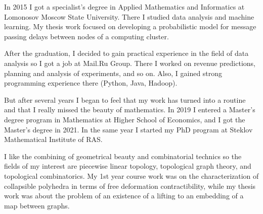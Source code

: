 \documentclass{resume}
\begin{document}
\vspace{1em}

In 2015 I got a specialist's degree in Applied Mathematics and Informatics at Lomonosov Moscow State
University. There I studied data analysis and machine learning. My thesis work focused on developing
a probabilistic model for message passing delays between nodes of a computing cluster.

After the graduation, I decided to gain practical experience in the field of data analysis so I got a
job at Mail.Ru Group. There I worked on revenue predictions, planning and analysis of experiments,
and so on. Also, I gained strong programming experience there (Python, Java, Hadoop).

But after several years I began to feel that my work has turned into a routine and that I really
missed the beauty of mathematics. In 2019 I entered a Master's degree program in Mathematics at
Higher School of Economics, and I got the Master's degree in 2021. In the same year I started my PhD
program at Steklov Mathematical Institute of RAS.

I like the combining of geometrical beauty and combinatorial technics so the fields of my interest
are piecewise linear topology, topological graph theory, and topological combinatorics. My 1st year
course work was on the characterization of collapsible polyhedra in terms of free deformation
contractibility, while my thesis work was about the problem of an existence of a lifting to an
embedding of a map between graphs.
\vspace{1em}
\end{document}

